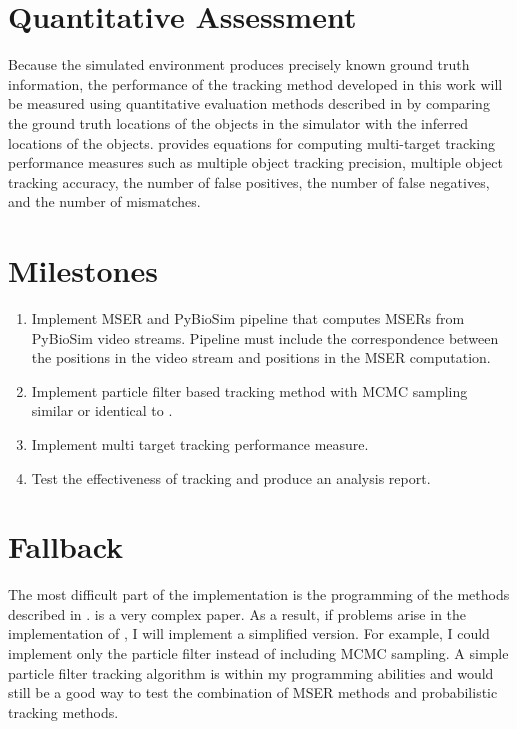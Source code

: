 \documentclass[conference]{IEEEtran}
\begin{document}
\section{Quantitative Assessment}

Because the simulated environment produces precisely known ground truth information, the performance of the tracking method developed in this work will be measured using quantitative evaluation methods described in \cite{Bernadin08eurasip} by comparing the ground truth locations of the objects in the simulator with the inferred locations of the objects. \cite{Bernadin08eurasip} provides equations for computing multi-target tracking performance measures such as multiple object tracking precision, multiple object tracking accuracy, the number of false positives, the number of false negatives, and the number of mismatches. 

\section{Milestones}

\begin{enumerate}
  \item Implement MSER and PyBioSim pipeline that computes MSERs from PyBioSim video streams. Pipeline must include the correspondence between the positions in the video stream and positions in the MSER computation. 
  \item Implement particle filter based tracking method with MCMC sampling similar or identical to \cite{Khan06pami}.
  \item Implement \cite{Bernadin08eurasip} multi target tracking performance measure.
  \item Test the effectiveness of tracking and produce an analysis report.
\end{enumerate}

\section{Fallback}

The most difficult part of the implementation is the programming of the methods described in \cite{Khan06pami}. \cite{Khan06pami} is a very complex paper. As a result, if problems arise in the implementation of \cite{Khan06pami}, I will implement a simplified version. For example, I could implement only the particle filter instead of including MCMC sampling. A simple particle filter tracking algorithm is within my programming abilities and would still be a good way to test the combination of MSER methods and probabilistic tracking methods. 
\end{document}
